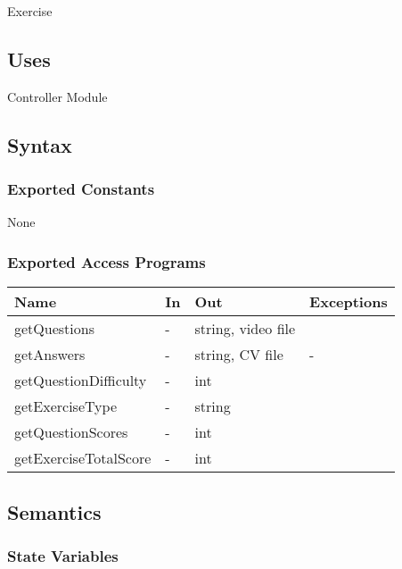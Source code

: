 \documentclass[12pt, titlepage]{article}
\begin{document}
Exercise

\subsection{Uses}

Controller Module

\subsection{Syntax}

\subsubsection{Exported Constants}

None

\subsubsection{Exported Access Programs}


\begin{center}
\begin{tabular}{p{4cm} p{3cm} p{3cm} p{4cm}}
\hline
\textbf{Name} & \textbf{In} & \textbf{Out} & \textbf{Exceptions} \\
\hline
getQuestions & - & string, video file & \\
getAnswers & - & string, CV file & - \\
getQuestionDifficulty & - & int &  \\
getExerciseType & - & string &  \\
getQuestionScores & - & int & \\
getExerciseTotalScore & - & int & \\
\hline
\end{tabular}
\end{center}

\subsection{Semantics}

\subsubsection{State Variables}
\end{document}
